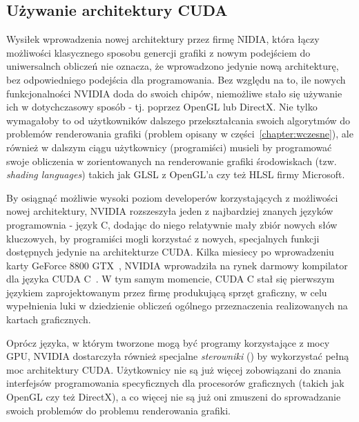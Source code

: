 \subsection{Używanie architektury CUDA}

Wysiłek wprowadzenia nowej architektury przez firmę NIDIA, która łączy możliwości klasycznego sposobu genercji grafiki z nowym podejściem do uniwersalnch obliczeń nie oznacza, że wprowadzono jedynie nową architekturę, bez odpowiedniego podejścia dla programowania. Bez względu na to, ile nowych funkcjonalności NVIDIA doda do swoich chipów, niemożliwe stało się używanie ich w dotychczasowy sposób - tj. poprzez OpenGL lub DirectX. Nie tylko wymagałoby to od użytkowników dalszego przekształcania swoich algorytmów do problemów renderowania grafiki (problem opisany w części~\ref{chapter:wczesne}), ale również w dalszym ciągu użytkownicy (programiści) musieli by programować swoje obliczenia w zorientowanych na renderowanie grafiki środowiskach (tzw. \emph{shading languages}) takich jak GLSL z OpenGL'a czy też HLSL firmy Microsoft.

By osiągnąć możliwie wysoki poziom developerów korzystających z możliwości nowej architektury, NVIDIA rozszeszyła jeden z najbardziej znanych języków programownia - język C, dodając do niego relatywnie mały zbiór nowych słów kluczowych, by programiści mogli korzystać z nowych, specjalnych funkcji dostępnych jedynie na architekturze CUDA. Kilka miesiecy po wprowadzeniu karty GeForce 8800 GTX~\cite{nvidia:geforce8800}, NVIDIA wprowadziła na rynek darmowy kompilator dla języka CUDA C~\cite{cuda:downloads}. W tym samym momencie, CUDA C stał się pierwszym językiem zaprojektowanym przez firmę produkującą sprzęt graficzny, w celu wypełnienia luki w dziedzienie obliczeń ogólnego przeznaczenia realizowanych na kartach graficznych.

Oprócz języka, w którym tworzone mogą być programy korzystające z mocy GPU, NVIDIA dostarczyła również specjalne \emph{sterowniki} () by wykorzystać pełną moc architektury CUDA. Użytkownicy nie są już więcej zobowiązani do znania interfejsów programowania specyficznych dla procesorów graficznych (takich jak OpenGL czy też DirectX), a co więcej nie są już oni zmuszeni do sprowadzanie swoich problemów do problemu renderowania grafiki.